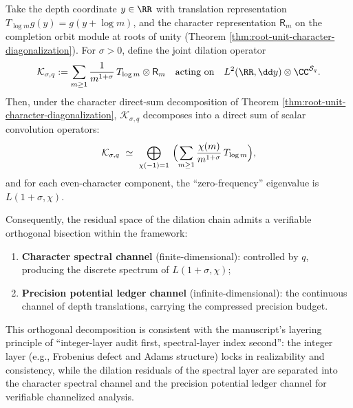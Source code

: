 \begin{theorem}\label{thm:character-precision-tensor}
Take the depth coordinate \(y\in\RR\) with translation representation \(T_{\log m}g(y)=g(y+\log m)\), and the character representation \(\mathsf{R}_m\) on the completion orbit module at roots of unity (Theorem \ref{thm:root-unit-character-diagonalization}). For \(\sigma>0\), define the joint dilation operator
\[
\mathcal{K}_{\sigma,q}:=\sum_{m\ge 1}\frac{1}{m^{1+\sigma}}\,T_{\log m}\otimes \mathsf{R}_m
\quad\text{acting on}\quad L^2(\RR,\dd y)\otimes \CC^{\mathcal{S}_q}.
\]
Then, under the character direct-sum decomposition of Theorem \ref{thm:root-unit-character-diagonalization}, \(\mathcal{K}_{\sigma,q}\) decomposes into a direct sum of scalar convolution operators:
\[
\mathcal{K}_{\sigma,q}\ \simeq\ \bigoplus_{\chi(-1)=1}\ \Bigl(\sum_{m\ge 1}\frac{\chi(m)}{m^{1+\sigma}}\,T_{\log m}\Bigr),
\]
and for each even-character component, the ``zero-frequency'' eigenvalue is \(L(1+\sigma,\chi)\).

Consequently, the residual space of the dilation chain admits a verifiable orthogonal bisection within the framework:
\begin{enumerate}
  \item \textbf{Character spectral channel} (finite-dimensional): controlled by \(q\), producing the discrete spectrum of \(L(1+\sigma,\chi)\);
  \item \textbf{Precision potential ledger channel} (infinite-dimensional): the continuous channel of depth translations, carrying the compressed precision budget.
\end{enumerate}
This orthogonal decomposition is consistent with the manuscript's layering principle of ``integer-layer audit first, spectral-layer index second'': the integer layer (e.g., Frobenius defect and Adams structure) locks in realizability and consistency, while the dilation residuals of the spectral layer are separated into the character spectral channel and the precision potential ledger channel for verifiable channelized analysis.
\end{theorem}
